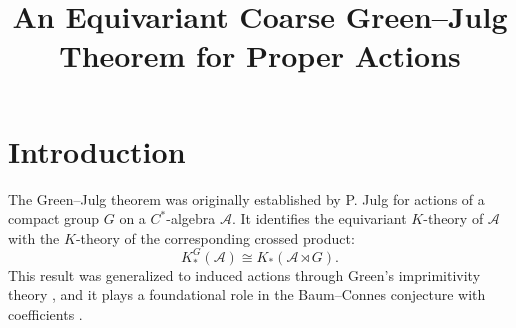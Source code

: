 \documentclass[pdflatex]{sn-jnl}
\theoremstyle{plain}
\theoremstyle{definition}
\begin{document}
\normalsize
\title[An Equivariant Coarse Green–Julg Theorem for Proper Actions]{\bfseries An Equivariant Coarse Green–Julg Theorem \break for Proper Actions}

\author[1]{ }

\author*[1]{ }




\maketitle
\tableofcontents

\section{Introduction}
The Green--Julg theorem was originally established by P. Julg \cite{Julg71,Jul81} for actions of a compact group $G$ on a $C^{*}$-algebra $\mathcal{A}$. It identifies the equivariant $K$-theory of $\mathcal{A}$ with the $K$-theory of the corresponding crossed product:
\[K_{*}^{G}(\mathcal{A})\cong K_{*}(\mathcal{A}\rtimes{G}).\]
This result was generalized to induced actions through Green's imprimitivity theory \cite{Gre78,Gre80}, and it plays a foundational role in the Baum--Connes conjecture with coefficients \cite{BC88,BCH94}.
\end{document}
